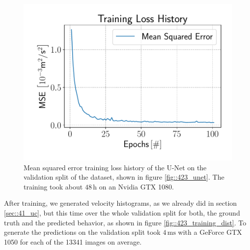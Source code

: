 \begin{figure}[h!]
	\centering
	\includegraphics[scale=.4]{chapters/11_autonomous_walking_experiments/img/05_07_19_loss_history.pdf}
	\caption{Mean squared error training loss history of the U-Net on the validation split of the dataset, shown in figure \ref{fig::423_unet}. The training took about $48\,\text{h}$ on an Nvidia GTX 1080.}
	\label{fig::423_loss}
\end{figure}
After training, we generated velocity histograms, as we already did in section \ref{sec::41_uc}, but this time over the whole validation split for both, the ground truth and the predicted behavior, as shown in figure \ref{fig::423_training_dist}. To generate the predictions on the validation split took $4\,\text{ms}$ with a GeForce GTX 1050 for each of the 13341 images on average.

